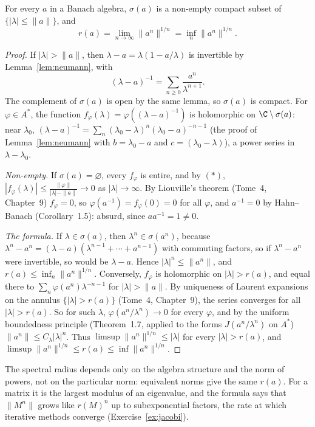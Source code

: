 \begin{theorem}[Gelfand]\label{thm:spectrum}
For every $a$ in a Banach algebra, $\sigma(a)$ is a non-empty compact subset of $\{|\lambda|\le\|a\|\}$, and
\[r(a)=\lim_{n\to\infty}\|a^n\|^{1/n}=\inf_n\|a^n\|^{1/n}.\]
\end{theorem}
\begin{proof}
If $|\lambda|>\|a\|$, then $\lambda-a=\lambda(1-a/\lambda)$ is invertible by Lemma~\ref{lem:neumann}, with
\[(\lambda-a)^{-1}=\sum_{n\ge0}\frac{a^n}{\lambda^{n+1}}.\tag{$*$}\]
The complement of $\sigma(a)$ is open by the same lemma, so $\sigma(a)$ is compact. For $\varphi\in A^*$, the function $f_\varphi(\lambda)=\varphi((\lambda-a)^{-1})$ is holomorphic on $\C\setminus\sigma(a)$: near $\lambda_0$,
$(\lambda-a)^{-1}=\sum_n(\lambda_0-\lambda)^n(\lambda_0-a)^{-n-1}$ (the proof of Lemma~\ref{lem:neumann} with $b=\lambda_0-a$ and $c=(\lambda_0-\lambda)$), a power series in $\lambda-\lambda_0$.

\emph{Non-empty.} If $\sigma(a)=\varnothing$, every $f_\varphi$ is entire, and by $(*)$, $|f_\varphi(\lambda)|\le\frac{\|\varphi\|}{|\lambda|-\|a\|}\to0$ as $|\lambda|\to\infty$. By Liouville's theorem (Tome~4, Chapter~9) $f_\varphi=0$, so
$\varphi(a^{-1})=f_\varphi(0)=0$ for all $\varphi$, and $a^{-1}=0$ by Hahn--Banach (Corollary~1.5): absurd, since $aa^{-1}=1\ne0$.

\emph{The formula.} If $\lambda\in\sigma(a)$, then $\lambda^n\in\sigma(a^n)$, because $\lambda^n-a^n=(\lambda-a)(\lambda^{n-1}+\cdots+a^{n-1})$ with commuting factors, so if $\lambda^n-a^n$ were invertible, so would be $\lambda-a$. Hence
$|\lambda|^n\le\|a^n\|$, and $r(a)\le\inf_n\|a^n\|^{1/n}$. Conversely, $f_\varphi$ is holomorphic on $|\lambda|>r(a)$, and equal there to $\sum_n\varphi(a^n)\lambda^{-n-1}$ for $|\lambda|>\|a\|$. By uniqueness of Laurent expansions on the
annulus $\{|\lambda|>r(a)\}$ (Tome~4, Chapter~9), the series converges for all $|\lambda|>r(a)$. So for such $\lambda$, $\varphi(a^n/\lambda^n)\to0$ for every $\varphi$, and by the uniform boundedness principle
(Theorem~1.7, applied to the forms $J(a^n/\lambda^n)$ on $A^*$) $\|a^n\|\le C_\lambda|\lambda|^n$. Thus $\limsup\|a^n\|^{1/n}\le|\lambda|$ for every $|\lambda|>r(a)$, and $\limsup\|a^n\|^{1/n}\le r(a)\le\inf\|a^n\|^{1/n}$.
\end{proof}

The spectral radius depends only on the algebra structure and the norm of powers, not on the particular norm: equivalent norms give the same $r(a)$. For a matrix it is the largest modulus of an eigenvalue, and the formula says
that $\|M^n\|$ grows like $r(M)^n$ up to subexponential factors, the rate at which iterative methods converge (Exercise~\ref{ex:jacobi}).

